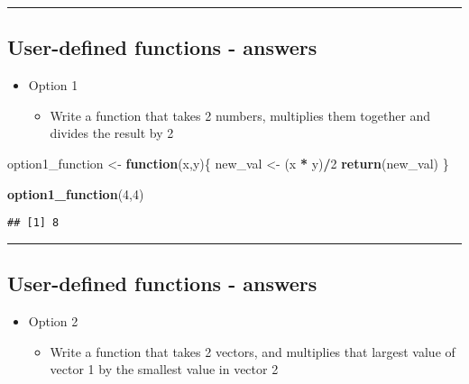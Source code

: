 \documentclass[]{article}
\newenvironment{Shaded}{\begin{snugshade}}{\end{snugshade}}
\newcommand{\ControlFlowTok}[1]{\textcolor[rgb]{0.13,0.29,0.53}{\textbf{#1}}}
\newcommand{\DecValTok}[1]{\textcolor[rgb]{0.00,0.00,0.81}{#1}}
\newcommand{\KeywordTok}[1]{\textcolor[rgb]{0.13,0.29,0.53}{\textbf{#1}}}
\newcommand{\NormalTok}[1]{#1}
\newcommand{\OperatorTok}[1]{\textcolor[rgb]{0.81,0.36,0.00}{\textbf{#1}}}
\newcommand{\StringTok}[1]{\textcolor[rgb]{0.31,0.60,0.02}{#1}}
\providecommand{\tightlist}{%
  \setlength{\itemsep}{0pt}\setlength{\parskip}{0pt}}
\begin{document}
\begin{center}\rule{0.5\linewidth}{\linethickness}\end{center}

\hypertarget{user-defined-functions---answers}{%
\subsection{User-defined functions -
answers}\label{user-defined-functions---answers}}

\begin{itemize}
\tightlist
\item
  Option 1

  \begin{itemize}
  \tightlist
  \item
    Write a function that takes 2 numbers, multiplies them together and
    divides the result by 2
  \end{itemize}
\end{itemize}

\begin{Shaded}
\begin{Highlighting}[]
\NormalTok{option1_function <-}\StringTok{ }\ControlFlowTok{function}\NormalTok{(x,y)\{}
\NormalTok{  new_val <-}\StringTok{ }\NormalTok{(x }\OperatorTok{*}\StringTok{ }\NormalTok{y)}\OperatorTok{/}\DecValTok{2}
  \KeywordTok{return}\NormalTok{(new_val)}
\NormalTok{\}}

\KeywordTok{option1_function}\NormalTok{(}\DecValTok{4}\NormalTok{,}\DecValTok{4}\NormalTok{)}
\end{Highlighting}
\end{Shaded}

\begin{verbatim}
## [1] 8
\end{verbatim}

\begin{center}\rule{0.5\linewidth}{\linethickness}\end{center}

\hypertarget{user-defined-functions---answers-1}{%
\subsection{User-defined functions -
answers}\label{user-defined-functions---answers-1}}

\begin{itemize}
\tightlist
\item
  Option 2

  \begin{itemize}
  \tightlist
  \item
    Write a function that takes 2 vectors, and multiplies that largest
    value of vector 1 by the smallest value in vector 2
  \end{itemize}
\end{itemize}
\end{document}
